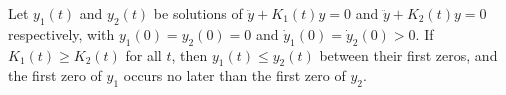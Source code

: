 Let $y_1(t)$ and $y_2(t)$ be solutions of $\ddot{y} + K_1(t) y = 0$ and $\ddot{y} + K_2(t) y = 0$ respectively, with $y_1(0) = y_2(0) = 0$ and $\dot{y}_1(0) = \dot{y}_2(0) > 0$. If $K_1(t) \geq K_2(t)$ for all $t$, then $y_1(t) \leq y_2(t)$ between their first zeros, and the first zero of $y_1$ occurs no later than the first zero of $y_2$.